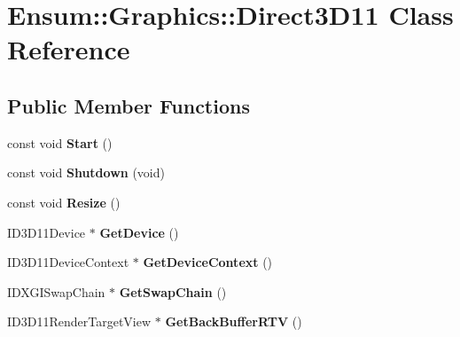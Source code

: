 \hypertarget{class_ensum_1_1_graphics_1_1_direct3_d11}{}\section{Ensum\+:\+:Graphics\+:\+:Direct3\+D11 Class Reference}
\label{class_ensum_1_1_graphics_1_1_direct3_d11}
\subsection*{Public Member Functions}
\begin{DoxyCompactItemize}
\item 
const void {\bfseries Start} ()\hypertarget{class_ensum_1_1_graphics_1_1_direct3_d11_a12b3a76ee7552796aef3385222a79c7b}{}\label{class_ensum_1_1_graphics_1_1_direct3_d11_a12b3a76ee7552796aef3385222a79c7b}

\item 
const void {\bfseries Shutdown} (void)\hypertarget{class_ensum_1_1_graphics_1_1_direct3_d11_ab8fab874dc6263d67ec4e9bfa0e2991e}{}\label{class_ensum_1_1_graphics_1_1_direct3_d11_ab8fab874dc6263d67ec4e9bfa0e2991e}

\item 
const void {\bfseries Resize} ()\hypertarget{class_ensum_1_1_graphics_1_1_direct3_d11_ac1d1ae70143ca8c795526dad0bf03fe6}{}\label{class_ensum_1_1_graphics_1_1_direct3_d11_ac1d1ae70143ca8c795526dad0bf03fe6}

\item 
I\+D3\+D11\+Device $\ast$ {\bfseries Get\+Device} ()\hypertarget{class_ensum_1_1_graphics_1_1_direct3_d11_a4ba00335d046107496f7bf9decc7f729}{}\label{class_ensum_1_1_graphics_1_1_direct3_d11_a4ba00335d046107496f7bf9decc7f729}

\item 
I\+D3\+D11\+Device\+Context $\ast$ {\bfseries Get\+Device\+Context} ()\hypertarget{class_ensum_1_1_graphics_1_1_direct3_d11_a5be4ad19e4d80399289e89eba6bdeb99}{}\label{class_ensum_1_1_graphics_1_1_direct3_d11_a5be4ad19e4d80399289e89eba6bdeb99}

\item 
I\+D\+X\+G\+I\+Swap\+Chain $\ast$ {\bfseries Get\+Swap\+Chain} ()\hypertarget{class_ensum_1_1_graphics_1_1_direct3_d11_ac022c45da3e0456366b2c99e533fb964}{}\label{class_ensum_1_1_graphics_1_1_direct3_d11_ac022c45da3e0456366b2c99e533fb964}

\item 
I\+D3\+D11\+Render\+Target\+View $\ast$ {\bfseries Get\+Back\+Buffer\+R\+TV} ()\hypertarget{class_ensum_1_1_graphics_1_1_direct3_d11_a03b866538c72558c4e43a7b76a2b1c2e}{}\label{class_ensum_1_1_graphics_1_1_direct3_d11_a03b866538c72558c4e43a7b76a2b1c2e}


\end{DoxyCompactItemize}
